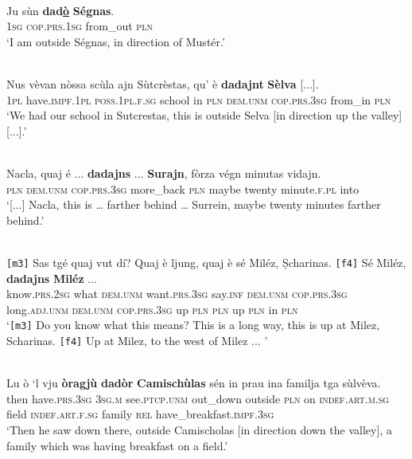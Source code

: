 \ea
\label{}
\\
\gll Ju sùn \textbf{dad\underline{ò}} \textbf{Ségnas}.\\
\textsc{1sg} \textsc{cop.prs.1sg} from\_out \textsc{pln}\\
\glt `I am outside Ségnas, in direction of Mustér.'
\z

\ea
\label{}
\\
\gll Nus vèvan nòssa scùla ajn Sùtcrèstas, qu’ è \textbf{dadajnt} \textbf{Sèlva} [...]. \\
\textsc{1pl} have.\textsc{impf.1pl} \textsc{poss.1pl.f.sg} school in \textsc{pln} \textsc{dem.unm} \textsc{cop.prs.3sg} from\_in \textsc{pln}\\
\glt `We had our school in Sutcrestas, this is outside Selva [in direction up the valley] [...].'
\z

\ea
\label{}
\\
\gll [...] Nacla, quaj é ... \textbf{dadajns} ... \textbf{Surajn}, fòrza végn minutas vidajn.\\
{} \textsc{pln} \textsc{dem.unm} \textsc{cop.prs.3sg} {} more\_back {} \textsc{pln} maybe twenty minute.\textsc{f.pl} into\\
\glt `[...] Nacla, this is … farther behind … Surrein, maybe twenty minutes farther behind.'
\z

\ea
\label{}
\\
	\gll \texttt{[m3]} Sas tgé quaj vut dí? Quaj è ljung, quaj è sé Miléz, Ṣcharinas. \texttt{[f4]} Sé Miléz, \textbf{dadajns} \textbf{Miléz} ... \\ 
{} know.\textsc{prs.2sg} what \textsc{dem.unm} want.\textsc{prs.3sg} say.\textsc{inf} \textsc{dem.unm} \textsc{cop.prs.3sg} long.\textsc{adj.unm} \textsc{dem.unm} \textsc{cop.prs.3sg} up \textsc{pln} \textsc{pln} {} up \textsc{pln} in \textsc{pln}\\
\glt  `\texttt{[m3]} Do you know what this means? This is a long way, this is up at Milez, Scharinas. \texttt{[f4]} Up at Milez, to the west of Milez ... '
\z

\ea
\label{}
\\
\gll Lu ò ‘l vju \textbf{òragjù} \textbf{dadòr} \textbf{Camischùlas} sén in prau ina familja tga sùlvèva.\\
then have.\textsc{prs.3sg} \textsc{3sg.m} see.\textsc{ptcp.unm} out\_down outside \textsc{pln} on \textsc{indef.art.m.sg} field \textsc{indef.art.f.sg} family \textsc{rel} have\_breakfast.\textsc{impf.3sg}\\
\glt `Then he saw down there, outside Camischolas [in direction down the valley], a family which was having breakfast on a field.'
\z


